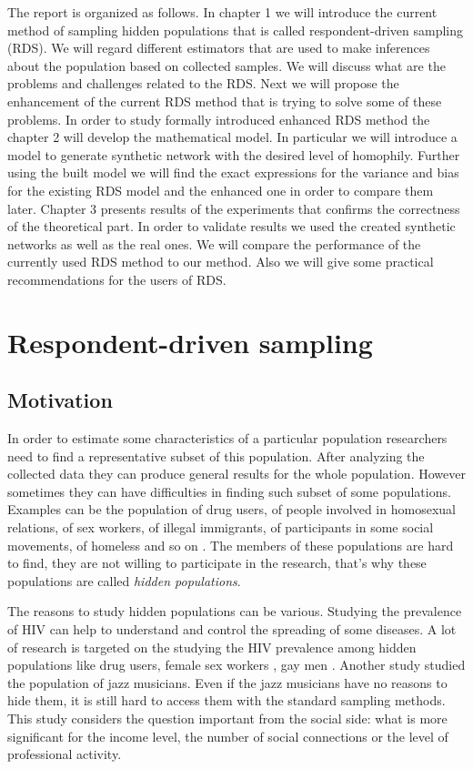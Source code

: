 \documentclass[12pt]{report}
\begin{document}
The report is organized as follows.
In chapter 1 we will introduce the current method of sampling hidden populations that is called respondent-driven sampling (RDS). We will regard different estimators that are used to make inferences about the population based on collected samples. We will discuss what are the problems and challenges related to the RDS. Next we will propose the enhancement of the current RDS method that is trying to solve some of these problems.
In order to study formally introduced enhanced RDS method the chapter 2 will develop the mathematical model. In particular we will introduce a model to generate synthetic network with the desired level of homophily. Further using the built model we will find the exact expressions for the variance and bias for the existing RDS model and the enhanced one in order to compare them later.
Chapter 3 presents results of the experiments that confirms the correctness of the theoretical part. In order to validate results we used the created synthetic networks as well as the real ones. We will compare the performance of the currently used RDS method to our method. Also we will give some practical recommendations for the users of RDS.



\chapter{Respondent-driven sampling}

\section{Motivation}

In order to estimate some characteristics of a particular population researchers need to find a representative subset of this population. After analyzing the collected data they can produce general results for the whole population.
However sometimes they can have difficulties in finding such subset of some populations. Examples can be the population of drug users, of people involved in homosexual relations, of sex workers, of illegal immigrants, of participants in some social movements, of homeless and so on \cite{salganik2004sampling}. The members of these populations are hard to find, they are not willing to participate in the research, that's why these populations are called \textit{hidden populations}.

The reasons to study hidden populations can be various. Studying the prevalence of HIV can help to understand and control the spreading of some diseases. A lot of research is targeted on the studying the HIV prevalence among hidden populations like drug users, female sex workers \cite{musyoki2015prevalence}, gay men \cite{ramirez2005networks}.  Another study \cite{heckathorn2003jazz} studied the population of jazz musicians. Even if the jazz musicians have no reasons to hide them, it is still hard to access them with the standard sampling methods. This study considers the question important from the social side: what is more significant for the income level, the number of social connections or the level of professional activity.
\end{document}
